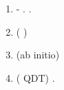 \documentclass[a4paper]{article}
\newcommand\liststyleWWNumiii{%
\renewcommand\theenumi{\arabic{enumi}}
\renewcommand\theenumii{\alph{enumii}}
\renewcommand\theenumiii{\roman{enumiii}}
\renewcommand\theenumiv{\arabic{enumiv}}
\renewcommand\labelenumi{\theenumi.}
\renewcommand\labelenumii{\theenumii.}
\renewcommand\labelenumiii{\theenumiii.}
\renewcommand\labelenumiv{\theenumiv.}
}
\begin{document}
\liststyleWWNumiii
\begin{enumerate}
\item {\CYRR}{\cyra}{\cyrs}{\cyrs}{\cyrm}{\cyro}{\cyrt}{\cyrr}{\cyre}{\cyrn}{\cyri}{\cyre}
{\cyrz}{\cyra}{\cyrd}{\cyra}{\cyrch}{\cyri} {\cyro}{\cyrb}
{\cyrz}{\cyra}{\cyrr}{\cyrya}{\cyrzh}{\cyre}{\cyrn}{\cyrn}{\cyro}{\cyrishrt}
{\cyrch}{\cyra}{\cyrs}{\cyrt}{\cyri}{\cyrc}{\cyre} {\cyrv}
{\cyrk}{\cyru}{\cyrl}{\cyro}{\cyrn}-{\cyrd}{\cyri}{\cyrp}{\cyro}{\cyrl}{\cyrsftsn}{\cyrn}{\cyro}{\cyrm}
{\cyrp}{\cyro}{\cyrl}{\cyre}. {\CYRR}{\cyra}{\cyrz}{\cyrd}{\cyre}{\cyrl}{\cyre}{\cyrn}{\cyri}{\cyre}
{\cyrp}{\cyre}{\cyrr}{\cyre}{\cyrm}{\cyre}{\cyrn}{\cyrn}{\cyrery}{\cyrh} {\cyrv}
{\cyru}{\cyrr}{\cyra}{\cyrv}{\cyrn}{\cyre}{\cyrn}{\cyri}{\cyri}
{\CYRSH}{\cyrr}{\cyre}{\cyrd}{\cyri}{\cyrn}{\cyrg}{\cyre}{\cyrr}{\cyra}.
\item {\CYRR}{\cyra}{\cyrs}{\cyrs}{\cyrm}{\cyro}{\cyrt}{\cyrr}{\cyre}{\cyrn}{\cyri}{\cyre} {\cyri}
{\cyra}{\cyrn}{\cyra}{\cyrl}{\cyri}{\cyrz}
{\cyrt}{\cyre}{\cyro}{\cyrr}{\cyre}{\cyrt}{\cyri}{\cyrch}{\cyre}{\cyrs}{\cyrk}{\cyri}{\cyrh}
{\cyrm}{\cyre}{\cyrt}{\cyro}{\cyrd}{\cyro}{\cyrv} {\cyrr}{\cyra}{\cyrs}{\cyrch}{\cyre}{\cyrt}{\cyra}
{\cyrm}{\cyra}{\cyrt}{\cyrr}{\cyri}{\cyrch}{\cyrn}{\cyrery}{\cyrh}
{\cyrerev}{\cyrl}{\cyre}{\cyrm}{\cyre}{\cyrn}{\cyrt}{\cyro}{\cyrv}
({\cyrr}{\cyra}{\cyrd}{\cyri}{\cyra}{\cyrl}{\cyrsftsn}{\cyrn}{\cyrery}{\cyrh} {\cyri}
{\cyru}{\cyrg}{\cyrl}{\cyro}{\cyrv}{\cyrery}{\cyrh} {\cyrch}{\cyra}{\cyrs}{\cyrt}{\cyre}{\cyrishrt})
\item {\CYRR}{\cyra}{\cyrs}{\cyrch}{\cyre}{\cyrt} (\foreignlanguage{english}{ab} \foreignlanguage{english}{initio})
{\cyrd}{\cyri}{\cyrp}{\cyro}{\cyrl}{\cyrsftsn}{\cyrn}{\cyrery}{\cyrh} {\cyri}
{\cyrk}{\cyrv}{\cyra}{\cyrd}{\cyrr}{\cyru}{\cyrp}{\cyro}{\cyrl}{\cyrsftsn}{\cyrn}{\cyrery}{\cyrh}
{\cyrm}{\cyro}{\cyrm}{\cyre}{\cyrn}{\cyrt}{\cyro}{\cyrv}
{\cyri}{\cyrs}{\cyrs}{\cyrl}{\cyre}{\cyrd}{\cyru}{\cyre}{\cyrm}{\cyrery}{\cyrh}
{\cyrm}{\cyro}{\cyrl}{\cyre}{\cyrk}{\cyru}{\cyrl}
\item {\CYRR}{\cyra}{\cyrs}{\cyrch}{\cyre}{\cyrt} ({\cyrn}{\cyra} {\cyro}{\cyrs}{\cyrn}{\cyro}{\cyrv}{\cyre}
{\cyrm}{\cyre}{\cyrt}{\cyro}{\cyrd}{\cyra} \foreignlanguage{english}{QDT}) {\cyrs}{\cyri}{\cyrl}
{\cyro}{\cyrs}{\cyrc}{\cyri}{\cyrl}{\cyrl}{\cyrya}{\cyrt}{\cyro}{\cyrr}{\cyro}{\cyrv}
{\cyri}{\cyrs}{\cyrs}{\cyrl}{\cyre}{\cyrd}{\cyru}{\cyre}{\cyrm}{\cyrery}{\cyrh}
{\cyrm}{\cyro}{\cyrl}{\cyre}{\cyrk}{\cyru}{\cyrl}.
\end{enumerate}
\end{document}
